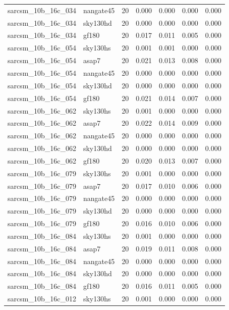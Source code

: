 \begin{tabular}{llrrrrr}
sarcsm\_10b\_16c\_034 & nangate45 & 20 & 0.000 & 0.000 & 0.000 & 0.000 \\
sarcsm\_10b\_16c\_034 & sky130hd & 20 & 0.000 & 0.000 & 0.000 & 0.000 \\
sarcsm\_10b\_16c\_034 & gf180 & 20 & 0.017 & 0.011 & 0.005 & 0.000 \\
sarcsm\_10b\_16c\_054 & sky130hs & 20 & 0.001 & 0.001 & 0.000 & 0.000 \\
sarcsm\_10b\_16c\_054 & asap7 & 20 & 0.021 & 0.013 & 0.008 & 0.000 \\
sarcsm\_10b\_16c\_054 & nangate45 & 20 & 0.000 & 0.000 & 0.000 & 0.000 \\
sarcsm\_10b\_16c\_054 & sky130hd & 20 & 0.000 & 0.000 & 0.000 & 0.000 \\
sarcsm\_10b\_16c\_054 & gf180 & 20 & 0.021 & 0.014 & 0.007 & 0.000 \\
sarcsm\_10b\_16c\_062 & sky130hs & 20 & 0.001 & 0.000 & 0.000 & 0.000 \\
sarcsm\_10b\_16c\_062 & asap7 & 20 & 0.022 & 0.014 & 0.009 & 0.000 \\
sarcsm\_10b\_16c\_062 & nangate45 & 20 & 0.000 & 0.000 & 0.000 & 0.000 \\
sarcsm\_10b\_16c\_062 & sky130hd & 20 & 0.000 & 0.000 & 0.000 & 0.000 \\
sarcsm\_10b\_16c\_062 & gf180 & 20 & 0.020 & 0.013 & 0.007 & 0.000 \\
sarcsm\_10b\_16c\_079 & sky130hs & 20 & 0.001 & 0.000 & 0.000 & 0.000 \\
sarcsm\_10b\_16c\_079 & asap7 & 20 & 0.017 & 0.010 & 0.006 & 0.000 \\
sarcsm\_10b\_16c\_079 & nangate45 & 20 & 0.000 & 0.000 & 0.000 & 0.000 \\
sarcsm\_10b\_16c\_079 & sky130hd & 20 & 0.000 & 0.000 & 0.000 & 0.000 \\
sarcsm\_10b\_16c\_079 & gf180 & 20 & 0.016 & 0.010 & 0.006 & 0.000 \\
sarcsm\_10b\_16c\_084 & sky130hs & 20 & 0.001 & 0.000 & 0.000 & 0.000 \\
sarcsm\_10b\_16c\_084 & asap7 & 20 & 0.019 & 0.011 & 0.008 & 0.000 \\
sarcsm\_10b\_16c\_084 & nangate45 & 20 & 0.000 & 0.000 & 0.000 & 0.000 \\
sarcsm\_10b\_16c\_084 & sky130hd & 20 & 0.000 & 0.000 & 0.000 & 0.000 \\
sarcsm\_10b\_16c\_084 & gf180 & 20 & 0.016 & 0.011 & 0.005 & 0.000 \\
sarcsm\_10b\_16c\_012 & sky130hs & 20 & 0.001 & 0.000 & 0.000 & 0.000 \\

\end{tabular}

